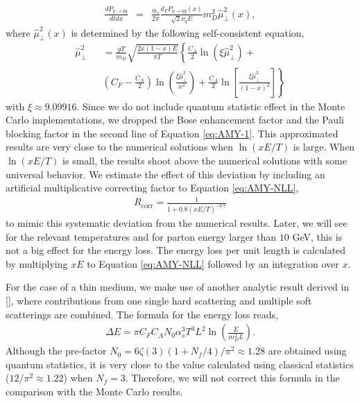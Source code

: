 \documentclass[aps, prc, reprint, amsmath, groupedaddress, nofootinbib]{revtex4-1}
\begin{document}
\begin{eqnarray}\label{eq:AMY-NLL}
\frac{dP_{q\rightarrow qg}}{dt dx} &=& \frac{\alpha_s}{2\pi}\frac{ d_F P_{q\rightarrow qg}(x)}{\sqrt{2}\nu_q E} m_D^2 \hat{\mu}_\perp^2(x),
\end{eqnarray}
where $\hat{\mu}_\perp^2(x)$ is determined by the following self-consistent equation,
\begin{eqnarray}\label{eq:AMY-sf}
\nonumber
\hat{\mu}_\perp^2 && = \frac{gT}{m_D} \sqrt{\frac{2x(1-x)E}{\pi T}}\left\{\frac{C_A}{2}\ln(\xi\hat{\mu}_\perp^2) + \right. \\
&&\left.\left(C_F-\frac{C_A}{2}\right)\ln\left(\frac{\xi\hat{\mu}_\perp^2}{x^2}\right) + \frac{C_A}{2}\ln\left[\frac{\xi\hat{\mu}_\perp^2}{(1-x)^2}\right]\right\}
\end{eqnarray}
with $\xi\approx9.09916$. Since we do not include quantum statistic effect in the Monte Carlo implementations, we dropped the Bose enhancement factor and the Pauli blocking factor in the second line of Equation \ref{eq:AMY-1}.
This approximated results are very close to the numerical solutions when $\ln(xE/T)$ is large. 
When $\ln(xE/T)$ is small, the results shoot above the numerical solutions with some universal behavior.
We estimate the effect of this deviation by including an artificial multiplicative correcting factor to Equation \ref{eq:AMY-NLL}, 
\begin{eqnarray}
R_{\textrm{corr}} = \frac{1}{1+0.8\left(xE/T\right)^{-0.7}}
\end{eqnarray}
to mimic this systematic deviation from the numerical results. 
Later, we will see for the relevant temperatures and for parton energy larger than $10$ GeV, this is not a big effect for the energy loss.
The energy loss per unit length is calculated by multiplying $xE$ to Equation \ref{eq:AMY-NLL} followed by an integration over $x$.

For the case of a thin medium, we make use of another analytic result derived in [], where contributions from one single hard scattering and multiple soft scatterings are combined. The formula for the energy loss reads,
\begin{eqnarray}\label{eq:dE-thin}
\Delta E = \pi C_F C_A N_0 \alpha_s^3 T^3 L^2 \ln\left(\frac{E}{m_D^2 L}\right).
\end{eqnarray}
Although the pre-factor $N_0 = 6\zeta(3)(1+N_f/4)/\pi^2 \approx 1.28$ 
are obtained using quantum statistics, it is very close to the value calculated using classical statistics ($12/\pi^2 \approx 1.22$) when $N_f=3$.
Therefore, we will not correct this formula in the comparison with the Monte Carlo results.
\end{document}
